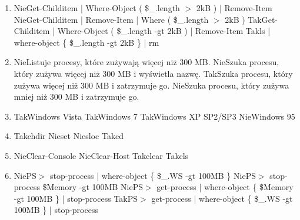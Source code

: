 \begin{enumerate}
		\newpage
		\item {}%
		{Nie}{Get-Childitem | Where-Object ( \$\_.length $>$ 2kB ) | Remove-Item}%
		{Nie}{Get-Childitem | Remove-Item | Where ( \$\_.length $>$ 2kB )}%
		{Tak}{Get-Childitem | Where-Object ( \$\_.length -gt 2kB ) | Remove-Item}%
		{Tak}{ls | where-object \{ \$\_.length -gt 2kB \} | rm}
		\item {}%
		{Nie}{Listuje procesy, które zużywają więcej niż 300 MB.}%
		{Nie}{Szuka procesu, który zużywa więcej niż 300 MB i wyświetla nazwę.}%
		{Tak}{Szuka procesu, który zużywa więcej niż 300 MB i zatrzymuje go.}%
		{Nie}{Szuka procesu, który zużywa mniej niż 300 MB i zatrzymuje go.}
		\item {}%
		{Tak}{Windows Vista}%
		{Tak}{Windows 7}%
		{Tak}{Windows XP SP2/SP3}%
		{Nie}{Windows 95}
		\item {}%
		{Tak}{chdir}%
		{Nie}{set}%
		{Nie}{sloc}%
		{Tak}{cd}
		\item {}%
		{Nie}{Clear-Console}%
		{Nie}{Clear-Host}%
		{Tak}{clear}%
		{Tak}{cls}
		\item {}%
		{Nie}{PS$ > $ stop-process | where-object \{ \$\_.WS -gt 100MB \}}%
		{Nie}{PS$ > $ stop-process \$Memory -gt 100MB}%
		{Nie}{PS$ > $ get-process | where-object \{ \$Memory -gt 100MB \} | stop-process}%
		{Tak}{PS$ > $ get-process | where-object \{ \$\_.WS -gt 100MB \} | stop-process}
		

\end{enumerate}

